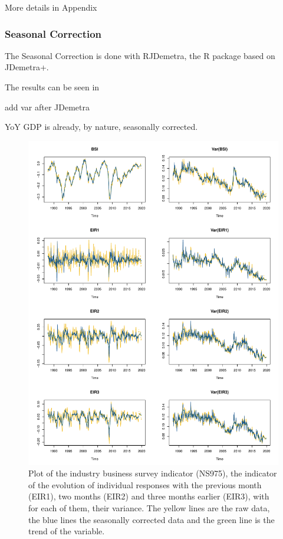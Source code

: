 \documentclass[12pt,a4paper,oneside]{book}
\begin{document}
More details in Appendix

\subsubsection{Seasonal Correction}

The Seasonal Correction is done with RJDemetra, the R package based on JDemetra+. 

The results can be seen in 

add var after JDemetra



YoY GDP is already, by nature, seasonally corrected.


\begin{figure}[H]
    \centering
    \includegraphics[scale=0.75]{Graphs/RJDemetra_plots.pdf}
    \caption{Plot of the industry business survey indicator (NS975), the indicator of the evolution of individual responses with the previous month (EIR1), two months (EIR2) and three months  earlier (EIR3), with for each of them, their variance. The yellow lines are the raw data, the blue lines the seasonally corrected data and the green line is the trend of the variable.}
    \label{fig:seasonal ajusted rjdemetra}
\end{figure}
\end{document}
